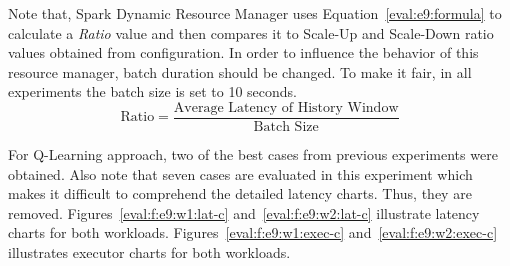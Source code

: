 Note that, Spark Dynamic Resource Manager uses Equation~\ref{eval:e9:formula} to calculate a \emph{Ratio} value and then compares it to Scale-Up and Scale-Down ratio values obtained from configuration. In order to influence the behavior of this resource manager, batch duration should be changed. To make it fair, in all experiments the batch size is set to 10 seconds.
\begin{equation}
\text{Ratio} = \frac{\text{Average Latency of History Window}}{\text{Batch Size}}
\label{eval:e9:formula}
\end{equation}

For Q-Learning approach, two of the best cases from previous experiments were obtained. Also note that seven cases are evaluated in this experiment which makes it difficult to comprehend the detailed latency charts. Thus, they are removed. Figures~\ref{eval:f:e9:w1:lat-c} and~\ref{eval:f:e9:w2:lat-c} illustrate latency charts for both workloads. Figures~\ref{eval:f:e9:w1:exec-c} and~\ref{eval:f:e9:w2:exec-c} illustrates executor charts for both workloads.
\clearpage
